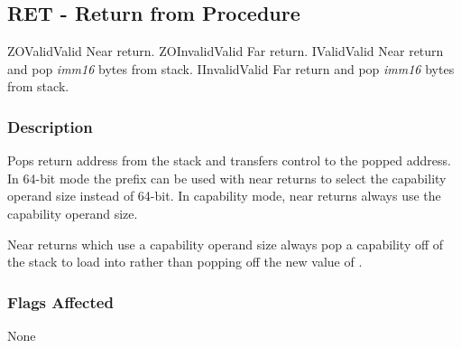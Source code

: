 \clearpage
{}
{}
\subsection*{RET - Return from Procedure}

\begin{x86opcodetable}
  {ZO}{Valid}{Valid}
  {Near return.}
  {ZO}{Invalid}{Valid}
  {Far return.}
  {I}{Valid}{Valid}
  {Near return and pop \emph{imm16} bytes from stack.}
  {I}{Invalid}{Valid}
  {Far return and pop \emph{imm16} bytes from stack.}
\end{x86opcodetable}

\begin{x86opentable}
\end{x86opentable}

\subsubsection*{Description}

Pops return address from the stack and transfers control to the popped
address.  In 64-bit mode the  prefix can be used with
near returns to select the capability operand size instead of 64-bit.
In capability mode, near returns always use the capability operand
size.

Near returns which use a capability operand size always pop a
capability off of the stack to load into \CIP{} rather than popping
off the new value of \RIP{}.

\subsubsection*{Flags Affected}

None
